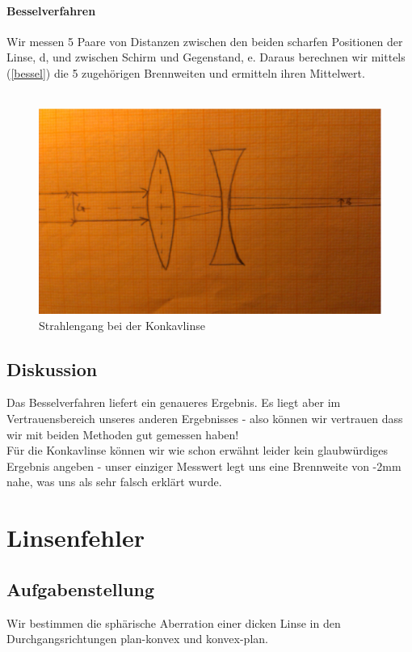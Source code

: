 \documentclass{article}
\begin{document}
\paragraph{Besselverfahren}
Wir messen 5 Paare von Distanzen zwischen den beiden scharfen Positionen der Linse, d, und zwischen Schirm und Gegenstand, e. Daraus berechnen wir mittels (\ref{bessel}) die 5 zugehörigen Brennweiten und ermitteln ihren Mittelwert.\\
\\
\begin{center}
\begin{figure}
\caption{Strahlengang bei der Konkavlinse}
\includegraphics[scale=0.5]{graph3.eps}
\end{figure}
\end{center}
\subsection{Diskussion}
Das Besselverfahren liefert ein genaueres Ergebnis. Es liegt aber im Vertrauensbereich unseres anderen Ergebnisses - also können wir vertrauen dass wir mit beiden Methoden gut gemessen haben!\\
Für die Konkavlinse können wir wie schon erwähnt leider kein glaubwürdiges Ergebnis angeben - unser einziger Messwert legt uns eine Brennweite von -2mm nahe, was uns als sehr falsch erklärt wurde. 
\section{Linsenfehler}

\subsection{Aufgabenstellung}
Wir bestimmen die sphärische Aberration einer dicken Linse in den Durchgangsrichtungen plan-konvex und konvex-plan.
\end{document}
